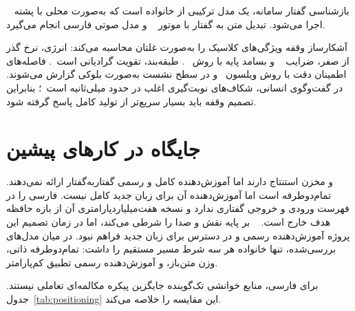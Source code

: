 بازشناسی گفتار سامانه، یک مدل ترکیبی  از خانواده
 است که به‌صورت محلی با پشته
~\cite{kuchaiev2019nemo} اجرا می‌شود. تبدیل متن به گفتار با موتور
~\cite{piper2023} و مدل صوتی فارسی انجام می‌گیرد.

آشکارساز وقفه ویژگی‌های کلاسیک را به‌صورت غلتان محاسبه می‌کند: انرژی، نرخ
گذر از صفر، ضرایب ~\cite{davis1980mfcc} و بسامد پایه با روش
~\cite{decheveigne2002yin}. طبقه‌بند، تقویت گرادیانی
است~\cite{friedman2001gbm}. فاصله‌های اطمینان دقت با روش
ویلسون~\cite{wilson1927interval} و در سطح نشست به‌صورت بلوکی گزارش
می‌شوند. در گفت‌وگوی انسانی، شکاف‌های نوبت‌گیری اغلب در حدود
 میلی‌ثانیه است~\cite{skantze2021turntaking}؛ بنابراین تصمیم وقفه
باید بسیار سریع‌تر از تولید کامل پاسخ گرفته شود.

\section{جایگاه در کارهای پیشین}
\label{sec:positioning}

 و  مخزن استنتاج دارند اما آموزش‌دهنده کامل
و رسمی گفتار‌به‌گفتار ارائه نمی‌دهند.  تمام‌دوطرفه است اما
آموزش‌دهنده آن برای زبان جدید کامل نیست.
 فارسی را در فهرست ورودی و خروجی گفتاری ندارد و نسخه
هفت‌میلیارد‌پارامتری آن از بازه حافظه هدف خارج است.
~\cite{roy2026personaplex} بر پایه  نقش و صدا را
شرطی می‌کند، اما در زمان تصمیم این پروژه آموزش‌دهنده رسمی و در دسترس برای
زبان جدید فراهم نبود. در میان مدل‌های بررسی‌شده، تنها خانواده 
هر سه شرط مسیر مستقیم را داشت: تمام‌دوطرفه ذاتی، وزن متن‌باز، و
آموزش‌دهنده رسمی تطبیق کم‌پارامتر.

برای فارسی، منابع خوانشی تک‌گوینده جایگزین پیکره مکالمه‌ای تعاملی نیستند.
جدول~\ref{tab:positioning} این مقایسه را خلاصه می‌کند.

